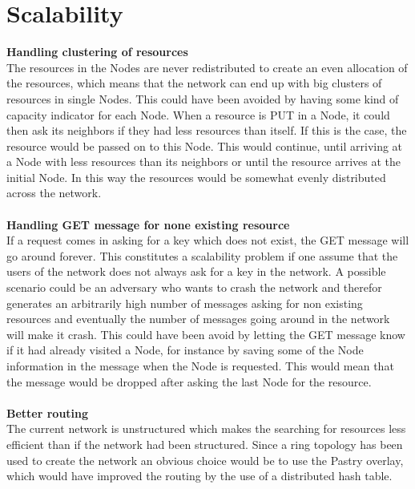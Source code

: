 \section{Scalability}
\textbf{\large{Handling clustering of resources}}\\
The resources in the Nodes are never redistributed to create an even allocation of the resources, which means that the network can end up with big clusters of resources in single Nodes. This could have been avoided by having some kind of capacity indicator for each Node. When a resource is PUT in a Node, it could then ask its neighbors if they had less resources than itself. If this is the case, the resource would be passed on to this Node. This would continue, until arriving at a Node with less resources than its neighbors or until the resource arrives at the initial Node. In this way the resources would be somewhat evenly distributed across the network.\\\\
\textbf{\large{Handling GET message for none existing resource}}\\
If a request comes in asking for a key which does not exist, the GET message will go around forever. This constitutes a scalability problem if one assume that the users of the network does not always ask for a key in the network. A possible scenario could be an adversary who wants to crash the network and therefor generates an arbitrarily high number of messages asking for non existing resources and eventually the number of messages going around in the network will make it crash.
This could have been avoid by letting the GET message know if it had already visited a Node, for instance by saving some of the Node information in the message when the Node is requested. This would mean that the message would be dropped after asking the last Node for the resource.\\\\
\textbf{\large{Better routing}}\\
The current network is unstructured which makes the searching for resources less efficient than if the network had been structured. Since a ring topology has been used to create the network an obvious choice would be to use the Pastry overlay, which would have improved the routing by the use of a distributed hash table.